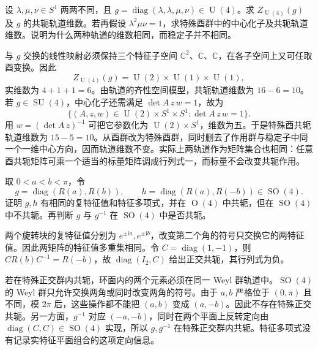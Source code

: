 \begin{exercise}\label{g1:ex:unitary-multiplicity-orbit}
	设 \(\lambda,\mu,\nu\in S^1\) 两两不同，且 \(g=\operatorname{diag}(\lambda,\lambda,\mu,\nu)\in\operatorname{U}(4)\)。求 \(Z_{\operatorname{U}(4)}(g)\) 及 \(g\) 的共轭轨道维数。若再假设 \(\lambda^2\mu\nu=1\)，求特殊酉群中的中心化子及共轭轨道维数。说明为什么两种轨道的维数相同，而稳定子并不相同。
\end{exercise}
\begin{solution}
	与 \(g\) 交换的线性映射必须保持三个特征子空间 \(\mathbb C^2\)、\(\mathbb C\)、\(\mathbb C\)，在各子空间上又可任取酉变换。因此
	\[
		Z_{\operatorname{U}(4)}(g)=\operatorname{U}(2)\times\operatorname{U}(1)\times\operatorname{U}(1),
	\]
	实维数为 \(4+1+1=6\)。由轨道的齐性空间模型，共轭轨道维数为 \(16-6=10\)。若 \(g\in\operatorname{SU}(4)\)，中心化子还需满足 \(\det A\,z\,w=1\)，故为
	\[
		\{(A,z,w)\in\operatorname{U}(2)\times S^1\times S^1:\det A\,z\,w=1\}.
	\]
	用 \(w=(\det A\,z)^{-1}\) 可把它参数化为 \(\operatorname{U}(2)\times S^1\)，维数为五。于是特殊酉共轭轨道维数为 \(15-5=10\)。从酉群改为特殊酉群，同时删去了作用群与稳定子中同一个一维中心方向，因而轨道维数不变。实际上两轨道作为矩阵集合也相同：任意酉共轭矩阵可乘一个适当的标量矩阵调成行列式一，而标量不会改变共轭作用。
\end{solution}

\begin{exercise}\label{g1:ex:so4-oriented-conjugacy}
	取 \(0<a<b<\pi\)，令
	\[
		g=\operatorname{diag}(R(a),R(b)),\qquad h=\operatorname{diag}(R(a),R(-b))\in\operatorname{SO}(4).
	\]
	证明 \(g,h\) 有相同的复特征值和特征多项式，并在 \(\operatorname{O}(4)\) 中共轭，但在 \(\operatorname{SO}(4)\) 中不共轭。再判断 \(g\) 与 \(g^{-1}\) 在 \(\operatorname{SO}(4)\) 中是否共轭。
\end{exercise}
\begin{solution}
	两个旋转块的复特征值分别为 \(e^{\pm\mathrm{i}a},e^{\pm\mathrm{i}b}\)，改变第二个角的符号只交换它的两特征值。因此两矩阵的特征值多重集相同。令 \(C=\operatorname{diag}(1,-1)\)，则 \(CR(b)C^{-1}=R(-b)\)，故 \(\operatorname{diag}(I_2,C)\) 给出正交共轭，其行列式为负。

	若在特殊正交群内共轭，环面内的两个元素必须在同一 Weyl 群轨道中。\(\operatorname{SO}(4)\) 的 Weyl 群只允许交换两角或同时改变两角的符号。由于 \(a,b\) 严格位于 \((0,\pi)\) 且不同，模 \(2\pi\) 后，这些操作都不能把 \((a,b)\) 变成 \((a,-b)\)。因此不存在特殊正交共轭。另一方面，\(g^{-1}\) 对应 \((-a,-b)\)，同时在两个平面上反转定向由 \(\operatorname{diag}(C,C)\in\operatorname{SO}(4)\) 实现，所以 \(g,g^{-1}\) 在特殊正交群内共轭。特征多项式没有记录实特征平面组合的这项定向信息。
\end{solution}

